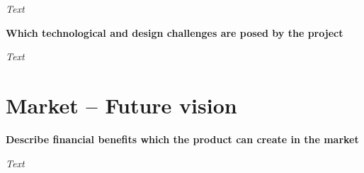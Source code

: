 \documentclass[11pt]{article} %
\begin{document}
\noindent
\textit{Text}

\noindent
\textbf{Which technological and design challenges are posed by the project}

\noindent
\textit{Text}

\section{Market – Future vision}

\noindent
\textbf{Describe financial benefits which the product can create in the market}

\noindent
\textit{Text}

\printbibliography
\end{document}
